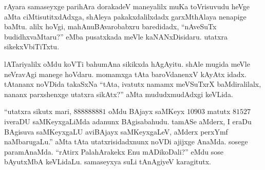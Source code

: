 rAyara samaseyxge parihAra dorakadeV maneyalilx muKa toVrisuvudu heVge aMta ciMtisutitxdAdxga, shAleya pakakxdalilxdadx garxMthAlaya nenapige baMtu. alilx hoVgi, mahAnuBAvarobabxru baredidadx, ``nAveSuTx budidhxvaMtaru?'' eMba pusatxkada meVle kaNANxDisidaru. utatxra sikekxVbiTiTxtu.

lATariyalilx oMdu koVTi bahumAna sikikxda hAgAyitu. shAle mugida meVle neVravAgi manege hoVdaru. momamxga tAta baroVdanenxV kAyAtx idadx. tAtananx noVDida takaSxNa ``tAta, ivatutx namamx meVSuTxrX baMdiralilalx, nananx parxshenxge utatxra sikAtx?'' aMta mududxmudAdxgi keVLida.

``utatxra sikutx mari, $888888881$ oMdu BAjayx saMKeyx $10903$ matutx $81527$ iveraDU saMKeyxgaLiMda adanunx BAgisabahudu. tamASe aMderx, I eraDu BAgisuva saMKeyxgaLU aviBAjayx saMKeyxgaLeV, aMderx perxYmf naMbarugaLu.'' aMta tAta utatxrisidadxnunx noVDi ajijxge AnaMda. sosege paramAnaMda. ``rAtirx PalahArakekx Enu mADikoDali?'' eMdu sose bAyutxMbA keVLidaLu. samaseyxya suLi tAnAgiyeV karagitutx.


